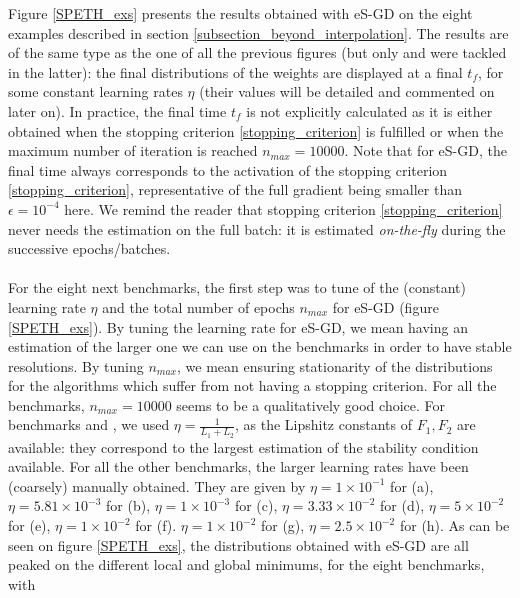 \documentclass[article,authoryear,jmlmc]{beg_32}             %
\begin{document}
Figure \ref{SPETH_exs} presents the results obtained with eS-GD on the eight examples described in section \ref{subsection_beyond_interpolation}. 
The results are of the same type as the one of all the previous figures (but only \exOne and \exTwo were tackled in the latter): the final distributions of the weights are
displayed at a final $t_f$, for some constant learning rates $\eta$ (their values will be detailed and commented on later on).  
In practice, the final time $t_f$ is not explicitly calculated as it is either obtained when the stopping criterion \eqref{stopping_criterion} is fulfilled or when the maximum number of iteration is reached
$n_{max} = 10000$.  
Note that for eS-GD, the final time always corresponds to the activation of the stopping criterion \eqref{stopping_criterion}, representative of the full gradient being smaller than $\epsilon =
10^{-4}$ here. We remind the reader that stopping criterion \eqref{stopping_criterion} never needs the estimation on the full batch: it is estimated {\em on-the-fly} during the successive
epochs/batches.  
\ \\ \ \\
For the eight next benchmarks, the first step was to tune of the (constant) learning rate $\eta$ and the total number of epochs $n_{max}$ for eS-GD (figure \ref{SPETH_exs}). 
By tuning the learning rate for eS-GD, we mean having an estimation of the larger one we can use on the benchmarks in order to 
have stable resolutions. 
By tuning $n_{max}$, we mean ensuring stationarity of the distributions for the algorithms which suffer from not having a stopping criterion.
For all the benchmarks, $n_{max}=10000$ seems to be a qualitatively good choice. 
For benchmarks \exOne and \exTwo, we used $\eta=\frac{1}{L_1+L_2}$, as the Lipshitz constants of $F_1,F_2$ are available: they correspond to 
the largest estimation of the stability condition available. 
For all the other benchmarks, the larger learning rates have been (coarsely) manually obtained. They are given by 
 $\eta = 1   \times 10^{-1}$  for \exOne    (a), 
 $\eta = 5.81\times 10^{-3}$  for \exTwo    (b), 
 $\eta = 1   \times 10^{-3}$  for \exThree  (c), 
 $\eta = 3.33\times 10^{-2}$  for \exFour   (d), 
 $\eta = 5   \times 10^{-2}$  for \exFive   (e), 
 $\eta = 1   \times 10^{-2}$  for \exSix    (f). 
 $\eta = 1   \times 10^{-2}$  for \exSeven  (g), 
 $\eta = 2.5 \times 10^{-2}$  for \exHeight (h). 
As can be seen on figure \ref{SPETH_exs}, the distributions obtained with eS-GD are all peaked on the different local and global minimums, for the eight benchmarks, with
\end{document}
